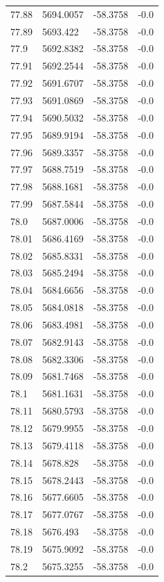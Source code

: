 \begin{table}[H]
\begin{tabular}{llll}
77.88 & 5694.0057 & -58.3758 & -0.0 \\
77.89 & 5693.422 & -58.3758 & -0.0 \\
77.9 & 5692.8382 & -58.3758 & -0.0 \\
77.91 & 5692.2544 & -58.3758 & -0.0 \\
77.92 & 5691.6707 & -58.3758 & -0.0 \\
77.93 & 5691.0869 & -58.3758 & -0.0 \\
77.94 & 5690.5032 & -58.3758 & -0.0 \\
77.95 & 5689.9194 & -58.3758 & -0.0 \\
77.96 & 5689.3357 & -58.3758 & -0.0 \\
77.97 & 5688.7519 & -58.3758 & -0.0 \\
77.98 & 5688.1681 & -58.3758 & -0.0 \\
77.99 & 5687.5844 & -58.3758 & -0.0 \\
78.0 & 5687.0006 & -58.3758 & -0.0 \\
78.01 & 5686.4169 & -58.3758 & -0.0 \\
78.02 & 5685.8331 & -58.3758 & -0.0 \\
78.03 & 5685.2494 & -58.3758 & -0.0 \\
78.04 & 5684.6656 & -58.3758 & -0.0 \\
78.05 & 5684.0818 & -58.3758 & -0.0 \\
78.06 & 5683.4981 & -58.3758 & -0.0 \\
78.07 & 5682.9143 & -58.3758 & -0.0 \\
78.08 & 5682.3306 & -58.3758 & -0.0 \\
78.09 & 5681.7468 & -58.3758 & -0.0 \\
78.1 & 5681.1631 & -58.3758 & -0.0 \\
78.11 & 5680.5793 & -58.3758 & -0.0 \\
78.12 & 5679.9955 & -58.3758 & -0.0 \\
78.13 & 5679.4118 & -58.3758 & -0.0 \\
78.14 & 5678.828 & -58.3758 & -0.0 \\
78.15 & 5678.2443 & -58.3758 & -0.0 \\
78.16 & 5677.6605 & -58.3758 & -0.0 \\
78.17 & 5677.0767 & -58.3758 & -0.0 \\
78.18 & 5676.493 & -58.3758 & -0.0 \\
78.19 & 5675.9092 & -58.3758 & -0.0 \\
78.2 & 5675.3255 & -58.3758 & -0.0 \\

\end{tabular}
\end{table}
